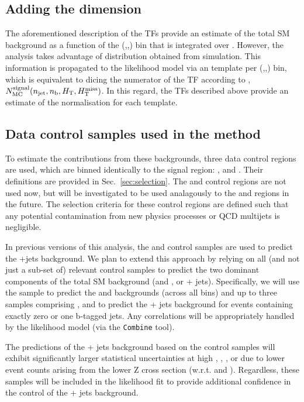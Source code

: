 \clearpage

\subsection{Adding the \mht dimension}

The aforementioned description of the TFs provide an estimate of the
total SM background as a function of the (\njet,\nb,\HT) bin that is
integrated over \mht. However, the analysis takes advantage of \mht
distribution obtained from simulation. This information is propagated
to the likelihood model via an \mht template per (\njet,\nb,\HT) bin,
which is equivalent to dicing the numerator of the TF according to
\mht, \ie $N_{\rm MC}^{\rm signal}(\njet,\nb,\scalht,\mht)$. In this
regard, the TFs described above provide an estimate of the
normalisation for each \mht template.

\subsection{Data control samples used in the method}

To estimate the contributions from these backgrounds, three data
control regions are used, which are binned identically to the signal
region: \mj, \mmj and \gj.  Their definitions are provided
in Sec.~\ref{sec:selection}. The \ej and \eej control regions are not
used now, but will be investigated to be used analagously to the \mj and \mmj regions in
the future. The selection criteria for these
control regions are defined such that any potential contamination from
new physics processes or QCD multijets is negligible.

In previous versions of this analysis, the \mmj and \gj control
samples are used to predict the \znunu +jets background. We plan to
extend this approach by relying on all (and not just a sub-set of)
relevant control samples to predict the two dominant components of the
total SM background (\wj and \ttbar, or \znunu + jets). Specifically,
we will use the \mj sample to predict the \wj and \ttbar backgrounds
(across all \nb bins) and up to three samples comprising \zmmj,
\gj and \wmj to predict the \znunu + jets background for events
containing exactly zero or one b-tagged jets. Any correlations will be
appropriately handled by the likelihood model (via the
\texttt{Combine} tool).

The predictions of the \znunu + jets background based on the \zmmj
control samples will exhibit significantly larger statistical
uncertainties at high \njet, \nb, \scalht, or \mht due to lower event
counts arising from the lower Z cross section (w.r.t. \gj and
\wj). Regardless, these samples will be included in the likelihood fit
to provide additional confidence in the control of the \znunu + jets
background.

